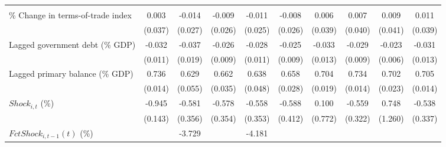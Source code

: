 {\begin{tabular}{l*{9}{c}}
                    &                     &                     &                     &                     &                     &                     &                     &                     &                     \\
\addlinespace
\% Change in terms-of-trade index&       0.003         &      -0.014         &      -0.009         &      -0.011         &      -0.008         &       0.006         &       0.007         &       0.009         &       0.011         \\
                    &     (0.037)         &     (0.027)         &     (0.026)         &     (0.025)         &     (0.026)         &     (0.039)         &     (0.040)         &     (0.041)         &     (0.039)         \\
\addlinespace
Lagged government debt (\% GDP)&      -0.032\sym{**} &      -0.037\sym{*}  &      -0.026\sym{**} &      -0.028\sym{**} &      -0.025\sym{**} &      -0.033\sym{**} &      -0.029\sym{**} &      -0.023\sym{***}&      -0.031\sym{**} \\
                    &     (0.011)         &     (0.019)         &     (0.009)         &     (0.011)         &     (0.009)         &     (0.013)         &     (0.009)         &     (0.006)         &     (0.013)         \\
\addlinespace
Lagged primary balance (\% GDP)&       0.736\sym{***}&       0.629\sym{***}&       0.662\sym{***}&       0.638\sym{***}&       0.658\sym{***}&       0.704\sym{***}&       0.734\sym{***}&       0.702\sym{***}&       0.705\sym{***}\\
                    &     (0.014)         &     (0.055)         &     (0.035)         &     (0.048)         &     (0.028)         &     (0.019)         &     (0.014)         &     (0.023)         &     (0.014)         \\
\addlinespace
$ Shock_{i,t}$ (\%) &      -0.945\sym{***}&      -0.581         &      -0.578         &      -0.558         &      -0.588         &       0.100         &      -0.559         &       0.748         &      -0.538         \\
                    &     (0.143)         &     (0.356)         &     (0.354)         &     (0.353)         &     (0.412)         &     (0.772)         &     (0.322)         &     (1.260)         &     (0.337)         \\
\addlinespace
$ FctShock_{i,t-1}(t)$ (\%)&                     &      -3.729         &                     &      -4.181         &                     &                     &                     &                     &                     \\

\end{tabular}}
